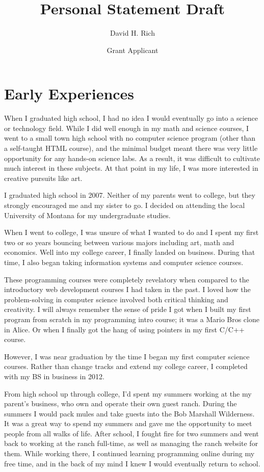 \documentclass{article}
\title{Personal Statement Draft}
\author{David H. Rich}
\date{Grant Applicant}
\begin{document}
	\maketitle%
	\thispagestyle{empty}
	\vspace{16pt}
	
	\section{Early Experiences}
	
	When I graduated high school, I had no idea I would eventually go into a science or technology field.  While I did well enough in my math and science courses, I went to a small town high school with no computer science program (other than a self-taught HTML course), and the minimal budget meant there was very little opportunity for any hands-on science labs. As a result, it was difficult to cultivate much interest in these subjects.  At that point in my life, I was more interested in creative pursuits like art.  
	
	I graduated high school in 2007.  Neither of my parents went to college, but they strongly encouraged me and my sister to go.  I decided on attending the local University of Montana for my undergraduate studies.
	
	When I went to college, I was unsure of what I wanted to do and I spent my first two or so years bouncing between various majors including art, math and economics.  Well into my college career, I finally landed on business.  During that time, I also began taking information systems and computer science courses.  
	
	These programming courses were completely revelatory when compared to the introductory web development courses I had taken in the past.  I loved how the problem-solving in computer science involved both critical thinking and creativity.  I will always remember the sense of pride I got when I built my first program from scratch in my programming intro course; it was a Mario Bros clone in Alice.  Or when I finally got the hang of using pointers in my first C/C++ course.  
	
	  However, I was near graduation by the time I began my first computer science courses.  Rather than change tracks and extend my college career, I completed with my BS in business in 2012. 
	
	From high school up through college, I'd spent my summers working at the my parent’s business, who own and operate their own guest ranch.  During the summers I would pack mules and take guests into the Bob Marshall Wilderness.  It was a great way to spend my summers and gave me the opportunity to meet people from all walks of life.  After school, I fought fire for two summers and went back to working at the ranch full-time, as well as managing the ranch website for them.  While working there, I continued learning programming online during my free time, and in the back of my mind I knew I would eventually return to school.
	
\end{document}
